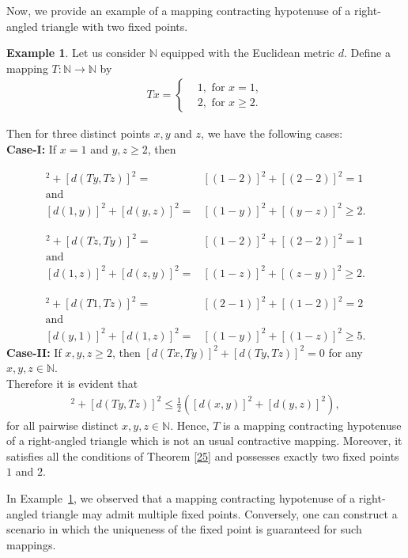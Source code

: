 \documentclass[11pt,reqno,a4paper]{amsart}
\theoremstyle{plain}
\theoremstyle{definition}
\newtheorem{example}[theorem]{Example}
\theoremstyle{remark}
\numberwithin{equation}{section}
\begin{document}
Now, we provide an example of a mapping contracting hypotenuse of a right-angled triangle with two fixed points.
\begin{example}\label{28}
Let us consider $\mathbb{N}$ equipped with the Euclidean metric $d$. Define a mapping $T:\mathbb{N}\to \mathbb{N}$ by
\begin{align*}
Tx=   
\begin{cases}
    &1, \text{ for }x=1,\\
    &2, \text{ for }x \ge 2. 
\end{cases}
\end{align*}

Then for three distinct points $x,y$ and $z$, we have the following cases:\\
\textbf{Case-I:} If $x=1$ and $y,z\ge 2$, then 

\begin{align*}
[d(T1,Ty)]^2+[d(Ty,Tz)]^2=&[(1-2)]^2+[(2-2)]^2=1\\ 
\text {and}\\
[d(1,y)]^2+[d(y,z)]^2=&[(1-y)]^2+[(y-z)]^2\ge 2. 
\end{align*}

\begin{align*}
[d(T1,Tz)]^2+[d(Tz,Ty)]^2=&[(1-2)]^2+[(2-2)]^2=1\\ 
\text {and}\\
[d(1,z)]^2+[d(z,y)]^2=&[(1-z)]^2+[(z-y)]^2\ge 2. 
\end{align*}

\begin{align*}
[d(Ty,T1)]^2+[d(T1,Tz)]^2=&[(2-1)]^2+[(1-2)]^2=2\\ 
\text {and}\\
[d(y,1)]^2+[d(1,z)]^2=&[(1-y)]^2+[(1-z)]^2\ge 5. 
\end{align*}
\textbf{Case-II:} If $x,y,z \ge 2$, then $[d(Tx,Ty)]^2+[d(Ty,Tz)]^2=0$ for any $x,y,z \in \mathbb{N}$.\\
Therefore it is evident that 
\begin{align*}
    [d(Tx,Ty)]^2+[d(Ty,Tz)]^2\le \frac{1}{2} ([d(x,y)]^2+[d(y,z)]^2),
\end{align*}
for all pairwise distinct $x,y,z \in \mathbb{N}$. Hence, $T$ is a mapping contracting hypotenuse of a right-angled triangle which is not an usual contractive mapping. Moreover, it satisfies all the conditions of Theorem \ref{25} and possesses exactly two fixed points $1$ and $2$.
\end{example}

In Example~\ref{28}, we observed that a mapping contracting hypotenuse of a right-angled triangle may admit multiple fixed points. Conversely, one can construct a scenario in which the uniqueness of the fixed point is guaranteed for such mappings.
\end{document}
